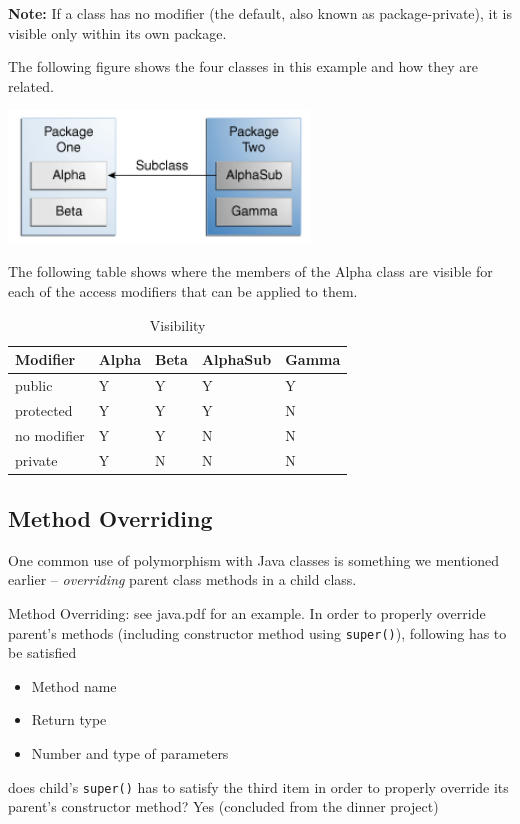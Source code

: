 \documentclass[a4paper, 12pt]{article}
\begin{document}
\textbf{Note:} If a class has no modifier (the default, also known as package-private), it is visible only within its own package.

The following figure shows the four classes in this example and how they are related.

\includegraphics[width=8cm]{pics/classes-access.png}

The following table shows where the members of the Alpha class are visible for each of the access modifiers that can be applied to them.
\begin{table}[htbp]
\centering
\caption{Visibility}
\begin{tabular}{lllll}
Modifier & Alpha & Beta & AlphaSub & Gamma \\ \hline
public & Y & Y & Y & Y \\ \hline
protected & Y & Y & Y & N \\ \hline
no modifier & Y & Y & N & N \\ \hline
private & Y & N & N & N \\ \hline
\end{tabular}
\end{table}

\subsection{Method Overriding}
One common use of polymorphism with Java classes is something we mentioned earlier -- \textit{overriding} parent class methods in a child class.

Method Overriding: see java.pdf for an example. In order to properly override parent's methods {\color{red}(including constructor method using \verb|super()|)}, following has to be satisfied
\begin{itemize}
\item Method name

\item Return type

\item Number and type of parameters

\end{itemize}
does child's \verb|super()| has to satisfy the third item in order to properly override its parent's constructor method? Yes (concluded from the dinner project)
\end{document}
